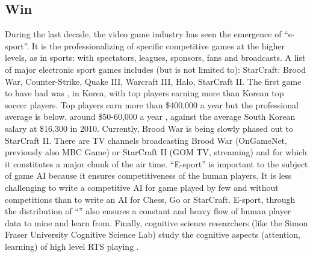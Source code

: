 \subsection{Win}
During the last decade, the video game industry has seen the emergence of ``e-sport''. It is the professionalizing of specific competitive games at the higher levels, as in sports: with spectators, leagues, sponsors, fans and broadcasts. A %
list of major electronic sport games includes (but is not limited to): StarCraft: Brood War, Counter-Strike, Quake III, Warcraft III, Halo, StarCraft II. The first game to have had  was , in Korea, with top players earning more than Korean top soccer players. Top players earn more than \$400,000 a year but the professional average is below, around \$50-60,000 a year \citep{TeamLiquidPGMIncome}, against the average South Korean salary at \$16,300 in 2010. Currently, Brood War is being slowly phased out to StarCraft II. %
There are TV channels broadcasting Brood War (OnGameNet, previously also MBC Game) or StarCraft II (GOM TV, streaming) and for which it constitutes a major chunk of the air time. %
``E-sport'' is important to the subject of game AI because it ensures competitiveness of the human players. It is less challenging to write a competitive AI for game played by few and without competitions than to write an AI for Chess, Go or StarCraft. E-sport, through the distribution of ``'' also ensures a constant and heavy flow of human player data to mine and learn from. Finally, cognitive science researchers (like the Simon Fraser University Cognitive Science Lab) study the cognitive aspects (attention, learning) of high level RTS playing \citep{SkillCraft}.

